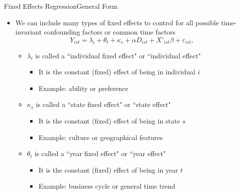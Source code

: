 \documentclass[dvipsnames,hyperref={pdfpagelabels=false}]{beamer}
\begin{document}
\begin{frame}{Fixed Effects Regression}{General Form}
	\begin{itemize} 
		\item We can include many types of fixed effects to control for all possible time-invariant confounding factors or common time factors 
		\begin{equation*}
			Y_{ist}=\lambda_{i}+ \theta_{t} + \kappa_{s} + \alpha D_{ist}+X'_{ist}\beta+\varepsilon_{ist},
		\end{equation*}
		\begin{itemize}
			
			\item $\lambda_{i}$ is called a ``individual fixed effect" or ``individual effect" 
			\vspace{0.2cm}
						\begin{itemize}
				\item It is the constant (fixed) effect of being in individual $i$
				\vspace{0.2cm}
				\item Example: ability or preference
										\vspace{0.2cm}
			\end{itemize}
			\item $\kappa_{s}$ is called a ``state fixed effect" or ``state effect" 
						\vspace{0.2cm}
					\begin{itemize}
			\item It is the constant (fixed) effect of being in state $s$
			\vspace{0.2cm}
						\item Example: culture or geographical features
									\vspace{0.2cm}
					\end{itemize}
			\item $\theta_{t}$ is called a ``year fixed effect" or ``year effect" 
			\vspace{0.2cm}
								\begin{itemize}
			\item It is the constant (fixed) effect of being in year $t$
			\vspace{0.2cm}
			\item Example: business cycle or general time trend
					\end{itemize}
		\end{itemize}
	\end{itemize}
\end{frame}
\end{document}
